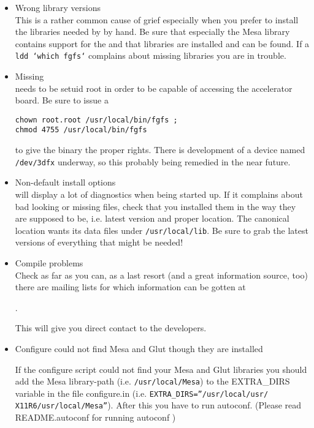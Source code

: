 \begin{itemize}

\item{Wrong library versions}\\
  This is a rather common cause of grief especially when you prefer to
  install the libraries needed by \FlightGear by hand. Be sure that
  especially the Mesa library contains support for the  and
  that  libraries are installed and can be found. If a
  \texttt{ldd `which fgfs`} complains about missing libraries you are  in trouble.

\item{Missing }\\
  \FlightGear needs to be setuid root in order to be capable of
  accessing the accelerator board. Be sure to issue a

  \texttt{chown root.root /usr/local/bin/fgfs ;}\\
  \texttt{chmod 4755 /usr/local/bin/fgfs}

  to give the \FlightGear binary the proper rights. There is development
  of a device named \texttt{/dev/3dfx} underway, so this probably
  being remedied in the near future.

\item{Non-default install options}\\
  \FlightGear will display a lot of diagnostics when being started up.
  If it complains about bad looking or missing files, check that you
  installed them in the way they are supposed to be, i.e. latest
  version and proper location. The canonical location \FlightGear
  wants its data files under \texttt{/usr/local/lib}. Be sure to
  grab the latest versions of everything that might be needed!

\item{Compile problems}\\
  Check as far as you can, as a last resort (and a great information
  source, too) there are mailing lists for which information can be
  gotten at

  .

This will give you direct contact to the developers.

\item{Configure could not find Mesa and Glut though they are
installed}

If the configure script could not find your Mesa and Glut libraries you should add the
Mesa library-path (i.e. \texttt{/usr/local/Mesa}) to the EXTRA\_DIRS variable in the file
configure.in (i.e. \texttt{EXTRA\_DIRS=''/usr/local/usr/}
\texttt{X11R6/usr/local/Mesa''}). After this you have to run autoconf. (Please read
README.autoconf for running autoconf )


\end{itemize}
